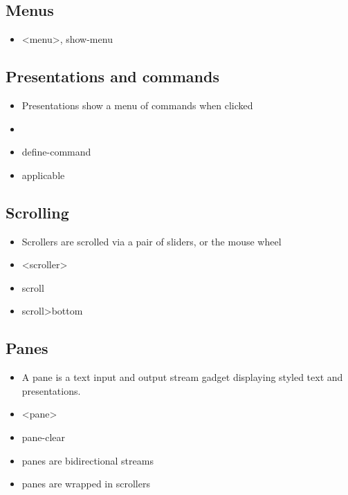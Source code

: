 \documentclass{book}
\begin{document}
\subsection{Menus}

\begin{itemize}

\item <menu>, show-menu

\end{itemize}

\subsection{Presentations and commands}

\begin{itemize}

\item Presentations show a menu of commands when clicked

\item <presentation>

\item define-command

\item applicable

\end{itemize}

\subsection{Scrolling}

\begin{itemize}

\item Scrollers are scrolled via a pair of sliders, or the mouse wheel

\item <scroller>

\item scroll

\item scroll>bottom

\end{itemize}

\subsection{Panes}\label{panes}

\begin{itemize}

\item A pane is a text input and output stream gadget displaying styled text and presentations.

\item <pane>

\item pane-clear

\item panes are bidirectional streams

\item panes are wrapped in scrollers

\end{itemize}
\end{document}
